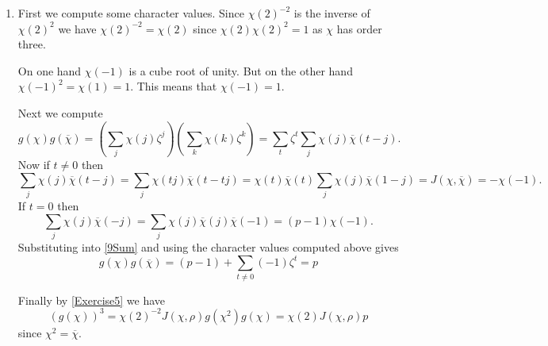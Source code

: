 \documentclass[12pt]{article}
\begin{document}
\begin{enumerate}
\item %
First we compute some character values.
Since $\chi\left(2\right)^{-2}$ is the inverse
of $\chi\left(2\right)^2$
we have $\chi\left(2\right)^{-2}=\chi\left(2\right)$
since $\chi\left(2\right)\chi\left(2\right)^2=1$
as $\chi$ has order three.

On one hand $\chi\left(-1\right)$ is a cube root
of unity. But on the other hand
$\chi\left(-1\right)^2=\chi\left(1\right)=1$.
This means that $\chi\left(-1\right)=1$.

Next we compute
\begin{equation}\label{9Sum}
g\left(\chi\right)g\left(\overline{\chi}\right)
=\left(\sum_j\chi\left(j\right)\zeta^j\right)
\left(\sum_k\chi\left(k\right)\zeta^k\right)
=\sum_t\zeta^t\sum_j\chi\left(j\right)\overline{\chi}\left(t-j\right).
\end{equation}
Now if $t\ne 0$ then
\[\sum_j\chi\left(j\right)\overline{\chi}\left(t-j\right)
=\sum_j\chi\left(tj\right)\overline{\chi}\left(t-tj\right)
=\chi\left(t\right)\overline{\chi}\left(t\right)
\sum_j\chi\left(j\right)\overline{\chi}\left(1-j\right)
=J\left(\chi,\overline{\chi}\right)=-\chi\left(-1\right).\]
If $t=0$ then
\[\sum_j\chi\left(j\right)\overline{\chi}\left(-j\right)
=\sum_j\chi\left(j\right)\overline{\chi}\left(j\right)
\overline{\chi}\left(-1\right)
=\left(p-1\right)\chi\left(-1\right).\]
Substituting into \autoref{9Sum} and using the character values
computed above gives
\[g\left(\chi\right)g\left(\overline{\chi}\right)
=\left(p-1\right)+\sum_{t\ne 0}\left(-1\right)\zeta^t=p\]

Finally by \autoref{Exercise5} we have
\[\left(g\left(\chi\right)\right)^3
=\chi\left(2\right)^{-2}J\left(\chi,\rho\right)g\left(\chi^2\right)
g\left(\chi\right)=\chi\left(2\right)J\left(\chi,\rho\right)p\]
since $\chi^2=\overline{\chi}$.

\end{enumerate}
\end{document}
